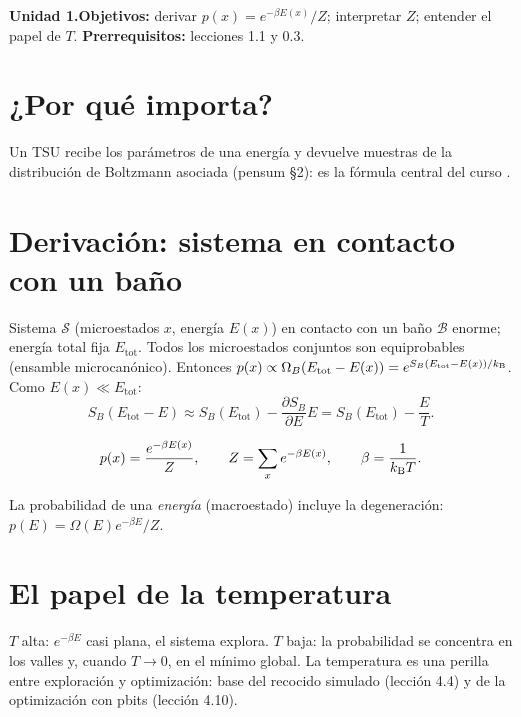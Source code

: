 \documentclass[11pt,a4paper]{article}
\begin{document}

\noindent\textbf{Unidad 1.}\quad\textbf{Objetivos:} derivar $p(x)=e^{-\beta E(x)}/Z$; interpretar $Z$; entender el papel de $T$.
\textbf{Prerrequisitos:} lecciones 1.1 y 0.3.

\section{¿Por qué importa?}
Un TSU recibe los parámetros de una energía y devuelve muestras de la distribución de Boltzmann asociada
(pensum §2): es la fórmula central del curso \cite{peliti,extropic}.

\section{Derivación: sistema en contacto con un baño}
Sistema $\mathcal S$ (microestados $x$, energía $E(x)$) en contacto con un baño $\mathcal B$ enorme; energía total fija
$E_{\text{tot}}$. Todos los microestados conjuntos son equiprobables (ensamble microcanónico). Entonces
$p(x)\propto\Omega_B(E_{\text{tot}}-E(x))=e^{S_B(E_{\text{tot}}-E(x))/k_{\mathrm B}}$. Como $E(x)\ll E_{\text{tot}}$:
\[S_B(E_{\text{tot}}-E)\approx S_B(E_{\text{tot}})-\frac{\partial S_B}{\partial E}E=S_B(E_{\text{tot}})-\frac ET .\]
\begin{resultado}
\begin{equation}p(x)=\frac{e^{-\beta E(x)}}{Z},\qquad Z=\sum_xe^{-\beta E(x)},\qquad\beta=\frac1{k_{\mathrm B} T}.\end{equation}
\end{resultado}
La probabilidad de una \emph{energía} (macroestado) incluye la degeneración: $p(E)=\Omega(E)e^{-\beta E}/Z$.

\section{El papel de la temperatura}
$T$ alta: $e^{-\beta E}$ casi plana, el sistema explora. $T$ baja: la probabilidad se concentra en los valles y, cuando
$T\to0$, en el mínimo global. La temperatura es una perilla entre exploración y optimización: base del recocido
simulado (lección 4.4) y de la optimización con pbits (lección 4.10).
\end{document}
